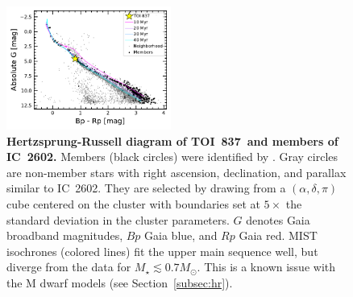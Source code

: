 \documentclass[12pt,twocolumn,tighten]{aastex63}
\newcommand{\tn}{TOI~837} %
\newcommand{\cn}{IC~2602} %
\begin{document}
\begin{figure}[!t]
	\begin{center}
		\leavevmode
		\includegraphics[width=0.48\textwidth]{f7.pdf}
	\end{center}
	\vspace{-0.7cm}
	\caption{ 
  {\bf Hertzsprung-Russell diagram of \tn\ and members of \cn.}
  Members (black circles) were identified by
  \citet{cantatgaudin_gaia_2018}.  Gray circles are non-member stars
  with right ascension, declination, and parallax similar to \cn.
  They are selected by drawing from a $(\alpha, \delta, \pi)$ cube
  centered on the cluster with boundaries set at $5\times$ the
  standard deviation in the cluster parameters.  $G$ denotes Gaia
  broadband magnitudes, $Bp$ Gaia blue, and $Rp$ Gaia red.  MIST
  isochrones (colored lines) fit the upper main sequence well, but
  diverge from the data for $M_\star \lesssim 0.7 M_\odot$. This is a
  known issue with the M dwarf models (see Section~\ref{subsec:hr}).
  \label{fig:hr}
	}
\end{figure}
\end{document}

